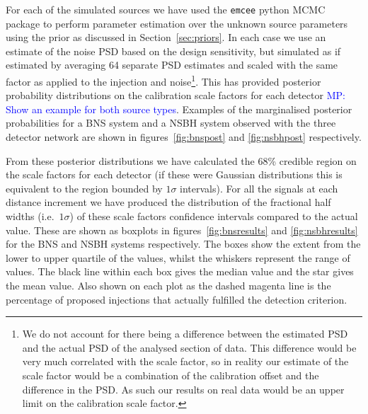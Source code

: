 \documentclass[10pt]{iopart}
\newcommand{\MP}[1]{\textcolor{blue}{MP: #1}}
\begin{document}
For each of the simulated sources we have used the {\tt emcee} python MCMC package to perform 
parameter estimation over the unknown source parameters using the prior as discussed in 
Section~\ref{sec:priors}. In each case we use an estimate of the noise PSD based on the design 
sensitivity, but simulated as if estimated by averaging 64 separate PSD estimates and scaled with 
the same factor as applied to the injection and noise\footnote{We do not account for there being 
a difference between the estimated PSD and the actual PSD of the analysed section of data. This 
difference would be very much correlated with the scale factor, so in reality our estimate of the 
scale factor would be a combination of the calibration offset and the difference in the PSD. As 
such our results on real data would be an upper limit on the calibration scale factor.}. This has 
provided posterior probability distributions on the calibration scale factors for each detector 
\MP{Show an example for both source types}. Examples of the marginalised posterior probabilities
for a \ac{BNS} system and a \ac{NSBH} system observed with the three detector network are shown in 
figures~\ref{fig:bnspost} and \ref{fig:nsbhpost} respectively.

From these posterior distributions we have calculated the 68\% credible region on the scale factors 
for each detector (if these were Gaussian distributions this is equivalent to the region bounded by 
$1\sigma$ intervals). For all the signals at each distance increment we have 
produced the distribution of the fractional half widths (i.e.\ $1\sigma$) of these scale factors 
confidence intervals compared to the actual value. These are shown as boxplots in 
figures~\ref{fig:bnsresults} and \ref{fig:nsbhresults} for the \ac{BNS} and \ac{NSBH} systems 
respectively. The boxes show the extent from the lower to upper quartile of the values, whilst the 
whiskers represent the range of values. The black line within each box gives the median value and 
the star gives the mean value. Also shown on each plot as the dashed magenta line is the percentage 
of proposed injections that actually fulfilled the detection criterion.
\end{document}
